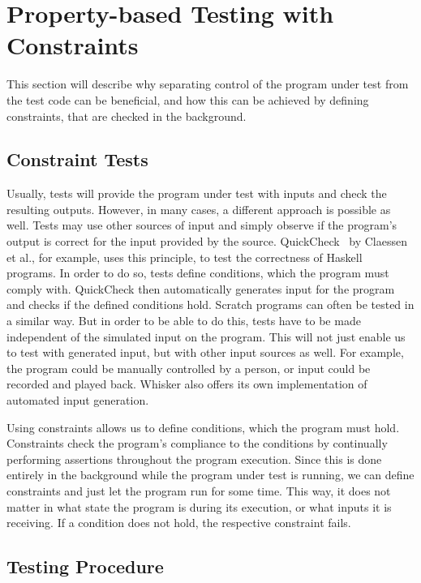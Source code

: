 \chapter{Property-based Testing with Constraints}
\label{cha:using_constraints_for_flexible_test_inputs}

This section will describe why separating control of the program under test from the test code can be beneficial,
and how this can be achieved by defining constraints, that are checked in the background.

\section{Constraint Tests}
\label{sec:input_independent_constraint_only_tests}

Usually, tests will provide the program under test with inputs and check the resulting outputs.
However, in many cases, a different approach is possible as well.
Tests may use other sources of input and simply observe if the program's output is correct for the input provided by the source.
QuickCheck~\cite{quickcheck} by Claessen et al., for example, uses this principle, to test the correctness of Haskell programs.
In order to do so, tests define conditions, which the program must comply with.
QuickCheck then automatically generates input for the program and checks if the defined conditions hold.
Scratch programs can often be tested in a similar way.
But in order to be able to do this, tests have to be made independent of the simulated input on the program.
This will not just enable us to test with generated input, but with other input sources as well.
For example, the program could be manually controlled by a person, or input could be recorded and played back.
Whisker also offers its own implementation of automated input generation.
\parspace

Using constraints allows us to define conditions, which the program must hold.
Constraints check the program's compliance to the conditions by continually performing assertions throughout the program execution.
Since this is done entirely in the background while the program under test is running, we can define constraints and just let the program run for some time.
This way, it does not matter in what state the program is during its execution, or what inputs it is receiving.
If a condition does not hold, the respective constraint fails.

\section{Testing Procedure}
\label{sec:constraint_testing_procedure}

